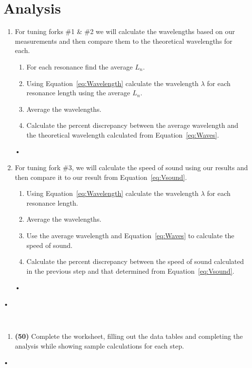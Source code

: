 \documentclass[main.tex]{subfiles}
\begin{document}
\section*{Analysis}
\begin{enumerate}
\item
For tuning forks \#1 \& \#2 we will calculate the wavelengths based on our measurements and then compare them to the theoretical wavelengths for each.
\begin{enumerate}
\item
For each resonance find the average $L_n.$
\item
Using Equation~\eqref{eq:Wavelength} calculate the wavelength $\lambda$ for each resonance length using the average $L_n.$
\item
Average the wavelengths.
\item
Calculate the percent discrepancy between the average wavelength and the theoretical wavelength calculated from Equation~\eqref{eq:Waves}.
\end{enumerate}•
\item
For tuning fork \#3, we will calculate the speed of sound using our results and then compare it to our result from Equation~\eqref{eq:Vsound}.
\begin{enumerate}
\item
Using Equation~\eqref{eq:Wavelength} calculate the wavelength $\lambda$ for each resonance length.
\item
Average the wavelengths.
\item
Use the average wavelength and Equation~\eqref{eq:Waves} to calculate the speed of sound.
\item
Calculate the percent discrepancy between the speed of sound calculated in the previous step and that determined from Equation~\eqref{eq:Vsound}.
\end{enumerate}•
\end{enumerate}•

\begin{samepage}
\hrulefill \\
\begin{enumerate}
\item
\textbf{(50)} Complete the worksheet, filling out the data tables and completing the analysis while showing sample calculations for each step.
\end{enumerate}•
\end{samepage}

\newpage
\end{document}
